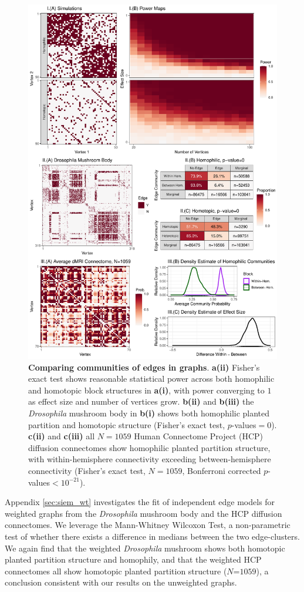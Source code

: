 \begin{figure}
    \centering
    \includegraphics[width=.9\linewidth]{figures/dnd/siem_figure.pdf}
    \caption{\textbf{Comparing communities of edges in graphs}. \textbf{a(ii)} Fisher's exact test shows reasonable statistical power across both homophilic and homotopic block structures in \textbf{a(i)}, with power converging to $1$ as effect size and number of vertices grow. \textbf{b(ii)} and \textbf{b(iii)} the \textit{Drosophila} mushroom body in \textbf{b(i)} shows both homophilic planted partition and homotopic structure (Fisher's exact test, $p$-values$=0$). \textbf{c(ii)} and \textbf{c(iii)} all $N=1059$ Human Connectome Project (HCP) diffusion connectomes show homophilic planted partition structure, with within-hemisphere connectivity exceeding between-hemisphere connectivity (Fisher's exact test, $N=1059$, Bonferroni corrected $p$-values$<10^{-21}$).}
    \label{fig:siem_uwt}
\end{figure}

Appendix \ref{sec:siem_wt} investigates the fit of independent edge models for weighted graphs from the \textit{Drosophila} mushroom body and the HCP diffusion connectomes. We leverage the Mann-Whitney Wilcoxon Test, a non-parametric test of whether there exists a difference in medians between the two edge-clusters. We again find that the weighted \textit{Drosophila} mushroom shows both homotopic planted partition structure and homophily, and that the weighted HCP connectomes all show homotopic planted partition structure ($N$=$1059$), a conclusion consistent with our results on the unweighted graphs. 

